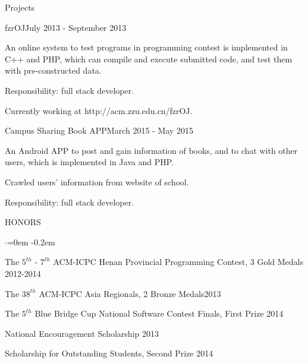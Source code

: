 \documentclass{resume} %
\begin{document}
\begin{rSection}{Projects}
\begin{rSubsection}{fzrOJ}{July 2013 - September 2013}{}{}
\item An online system to test programs in programming contest is implemented in C++ and PHP, which can compile and execute submitted code, and test them with pre-constructed data.
\item Responsibility: full stack developer. 
\item Currently working at http://acm.zzu.edu.cn/fzrOJ.
\end{rSubsection}

\begin{rSubsection}{Campus Sharing Book APP}{March 2015 - May 2015}{}{}
\item An Android APP to post and gain information of books, and to chat with other users, which is implemented in Java and PHP.
\item Crawled users' information from website of school.
\item Responsibility: full stack developer.
\end{rSubsection}
\end{rSection}




\begin{rSection}{HONORS}
\begin{list}{$\cdot$}{\leftmargin=0em}
\itemsep -0.2em \vspace{0em}
\item The $5^{th}$ - $7^{th}$ ACM-ICPC Henan Provincial Programming Contest, 3 Gold Medals \hfill {2012-2014}
\item The $38^{th}$ ACM-ICPC Asia Regionals, 2 Bronze Medals\hfill {2013}
\item The $5^{th}$ Blue Bridge Cup National Software Contest Finals, First Prize \hfill {2014}
\item National Encouragement Scholarship \hfill {2013}
\item Scholarship for Outstanding Students, Second Prize \hfill {2014}
\end{list}
\vspace{0.5em}
\end{rSection}
\end{document}
